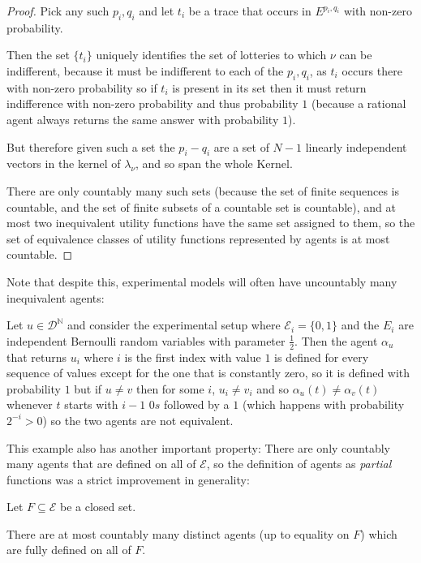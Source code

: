 \begin{proof}
Pick any such $p_i, q_i$ and let $t_i$ be a trace that occurs in $E^{p_i, q_i}$
with non-zero probability.

Then the set $\{t_i\}$ uniquely identifies the set of lotteries to which
$\nu$ can be indifferent, because it must be indifferent to each of the $p_i, q_i$,
as $t_i$ occurs there with non-zero probability so if $t_i$ is present
in its set then it must return indifference with non-zero probability and
thus probability $1$ (because a rational agent always returns the same
answer with probability $1$).

But therefore given such a set the $p_i - q_i$ are a set of $N - 1$ linearly
independent vectors in the kernel of $\lambda_\nu$, and so span the whole Kernel.

There are only countably many such sets (because the set of finite sequences is
countable, and the set of finite subsets of a countable set is countable), and
at most two inequivalent utility functions have the same set assigned to them,
so the set of equivalence classes of utility functions represented by agents
is at most countable.

\end{proof}

Note that despite this, experimental models will often have uncountably many
inequivalent agents:

Let $u \in \mathcal{D}^\mathbb{N}$
and consider the experimental setup where
$\mathcal{E}_i = \{0, 1\}$
and the $E_i$
are independent Bernoulli random
variables with parameter $\frac{1}{2}$.
Then the agent $\alpha_u$
that returns $u_i$
where $i$
is the first index with value $1$
is defined for every sequence of values except for the one that is
constantly zero, so it is defined with probability $1$
but if $u \neq v$
then for some $i$,
$u_i \neq v_i$
and so $\alpha_u(t) \neq \alpha_v(t)$
whenever $t$
starts with $i - 1$
$0s$
followed by a $1$
(which happens with probability $2^{-i} > 0$)
so the two agents are not equivalent.

This example also has another important property: There are only countably
many agents that are defined on all of $\mathcal{E}$,
so the definition of agents as \textit{partial} functions was a strict
improvement in generality:

\begin{theorem}
Let $F \subseteq \mathcal{E}$
be a closed set.

There are at most countably many distinct agents (up to equality on $F$)
which are fully defined on all of $F$.
\end{theorem}

